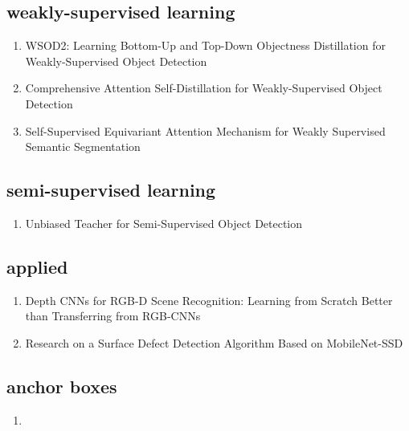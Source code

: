 \documentclass[acmlarge]{acmart}
\begin{document}
	\subsection{weakly-supervised learning}
	\begin{enumerate}
		\item WSOD2: Learning Bottom-Up and Top-Down Objectness Distillation for Weakly-Supervised Object Detection \cite{Zeng2019WSOD2LB} 

		\item Comprehensive Attention Self-Distillation for Weakly-Supervised Object Detection \cite{Huang2020ComprehensiveAS} 

		\item Self-Supervised Equivariant Attention Mechanism for Weakly Supervised Semantic Segmentation \cite{Wang2020SelfSupervisedEA} 

	\end{enumerate}
	\subsection{semi-supervised learning}
	\begin{enumerate}
		\item Unbiased Teacher for Semi-Supervised Object Detection \cite{Liu2021UnbiasedTF} 

	\end{enumerate}
	\subsection{applied}
	\begin{enumerate}
		\item Depth CNNs for RGB-D Scene Recognition: Learning from Scratch Better than Transferring from RGB-CNNs \cite{Song2017DepthCF} 

		\item Research on a Surface Defect Detection Algorithm Based on MobileNet-SSD \cite{Li2018ResearchOA} 

	\end{enumerate}
	\subsection{anchor boxes}
	\begin{enumerate}
		\item
	\end{enumerate}
\end{document}
